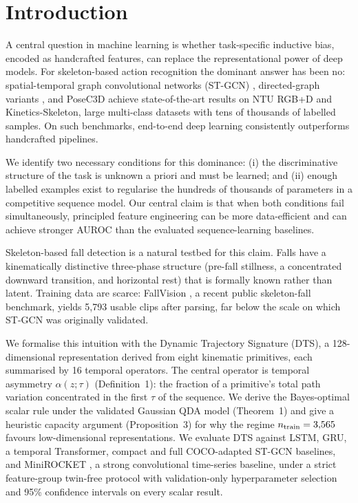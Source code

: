 \documentclass[letterpaper]{article}
\begin{document}
\section{Introduction}
A central question in machine learning is whether task-specific inductive bias, encoded as handcrafted features, can replace the representational power of deep models. For skeleton-based action recognition the dominant answer has been no: spatial-temporal graph convolutional networks (ST-GCN) \citep{yan2018}, directed-graph variants \citep{shi2019}, and PoseC3D \citep{duan2022} achieve state-of-the-art results on NTU RGB+D and Kinetics-Skeleton, large multi-class datasets with tens of thousands of labelled samples. On such benchmarks, end-to-end deep learning consistently outperforms handcrafted pipelines.

We identify two necessary conditions for this dominance: (i) the discriminative structure of the task is unknown a priori and must be learned; and (ii) enough labelled examples exist to regularise the hundreds of thousands of parameters in a competitive sequence model. Our central claim is that when both conditions fail simultaneously, principled feature engineering can be more data-efficient and can achieve stronger AUROC than the evaluated sequence-learning baselines.

Skeleton-based fall detection is a natural testbed for this claim. Falls have a kinematically distinctive three-phase structure (pre-fall stillness, a concentrated downward transition, and horizontal rest) that is formally known rather than latent. Training data are scarce: FallVision \citep{fallvision2024}, a recent public skeleton-fall benchmark, yields 5{,}793 usable clips after parsing, far below the scale on which ST-GCN was originally validated.

We formalise this intuition with the Dynamic Trajectory Signature (DTS), a 128-dimensional representation derived from eight kinematic primitives, each summarised by 16 temporal operators. The central operator is temporal asymmetry $\alpha(z;\tau)$ (Definition~1): the fraction of a primitive's total path variation concentrated in the first $\tau$ of the sequence. We derive the Bayes-optimal scalar rule under the validated Gaussian QDA model (Theorem~1) and give a heuristic capacity argument (Proposition~3) for why the regime $n_{\mathrm{train}} = 3{,}565$ favours low-dimensional representations. We evaluate DTS against LSTM, GRU, a temporal Transformer, compact and full COCO-adapted ST-GCN baselines, and MiniROCKET \citep{dempster2021}, a strong convolutional time-series baseline, under a strict feature-group twin-free protocol with validation-only hyperparameter selection and 95\% confidence intervals on every scalar result.
\end{document}
